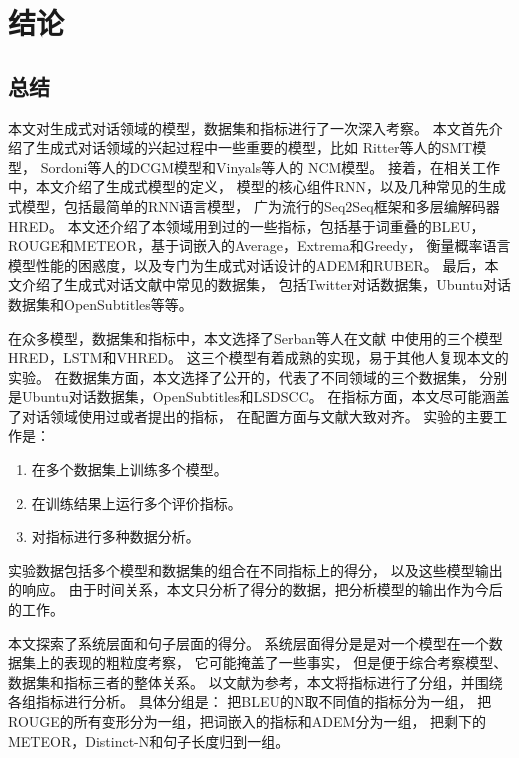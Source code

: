 \chapter*{结论}\label{ch:conclusion}

\section*{总结}\label{sec:conclusion}

本文对生成式对话领域的模型，数据集和指标进行了一次深入考察。
本文首先介绍了生成式对话领域的兴起过程中一些重要的模型，比如
Ritter等人的SMT模型，
Sordoni等人的DCGM模型和Vinyals等人的
NCM模型。
接着，在相关工作中，本文介绍了生成式模型的定义，
模型的核心组件RNN，以及几种常见的生成式模型，包括最简单的RNN语言模型，
广为流行的Seq2Seq框架和多层编解码器HRED。
本文还介绍了本领域用到过的一些指标，包括基于词重叠的BLEU，
ROUGE和METEOR，基于词嵌入的Average，Extrema和Greedy，
衡量概率语言模型性能的困惑度，以及专门为生成式对话设计的ADEM和RUBER。
最后，本文介绍了生成式对话文献中常见的数据集，
包括Twitter对话数据集，Ubuntu对话数据集和OpenSubtitles等等。

在众多模型，数据集和指标中，本文选择了Serban等人在文献\cite{VHRED}
中使用的三个模型HRED，LSTM和VHRED。
这三个模型有着成熟的实现，易于其他人复现本文的实验。
在数据集方面，本文选择了公开的，代表了不同领域的三个数据集，
分别是Ubuntu对话数据集，OpenSubtitles和LSDSCC。
在指标方面，本文尽可能涵盖了对话领域使用过或者提出的指标，
在配置方面与文献\cite{HowNot}大致对齐。
实验的主要工作是：
\begin{enumerate}
    \item 在多个数据集上训练多个模型。
    \item 在训练结果上运行多个评价指标。
    \item 对指标进行多种数据分析。
\end{enumerate}
实验数据包括多个模型和数据集的组合在不同指标上的得分， 以及这些模型输出的响应。
由于时间关系，本文只分析了得分的数据，把分析模型的输出作为今后的工作。

本文探索了系统层面和句子层面的得分。
系统层面得分是是对一个模型在一个数据集上的表现的粗粒度考察，
它可能掩盖了一些事实，
但是便于综合考察模型、数据集和指标三者的整体关系。
以文献\cite{HowNot}为参考，本文将指标进行了分组，并围绕各组指标进行分析。
具体分组是：
把BLEU的N取不同值的指标分为一组，
把ROUGE的所有变形分为一组，把词嵌入的指标和ADEM分为一组，
把剩下的METEOR，Distinct-N和句子长度归到一组。

